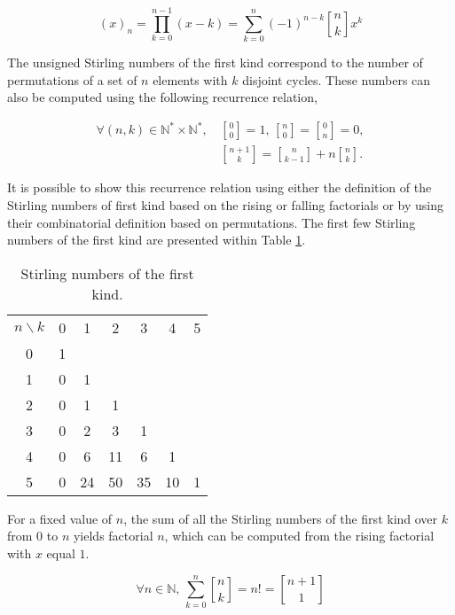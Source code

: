 \begin{equation} \label{eqnA.2}
(x)_{n} = \prod_{k=0}^{n-1} (x-k) = \sum_{k=0}^{n} (-1)^{n-k} \genfrac{[}{]}{0pt}{0}{n}{k} x^{k} 
\end{equation}

The unsigned Stirling numbers of the first kind correspond to the number of permutations of a set of $n$ elements with $k$ disjoint cycles. These numbers can also be computed using the following recurrence relation,

\begin{subequations} \label{eqnA.3}
\begin{align}
\forall (n,k) \in \mathbb{N}^{*} \times \mathbb{N}^{*} ,\, & \genfrac{[}{]}{0pt}{0}{0}{0} = 1 ,\, \genfrac{[}{]}{0pt}{0}{n}{0} = \genfrac{[}{]}{0pt}{0}{0}{n} = 0, \label{eqnA.3a} \\
& \genfrac{[}{]}{0pt}{0}{n+1}{k} = \genfrac{[}{]}{0pt}{0}{n}{k-1} + n \genfrac{[}{]}{0pt}{0}{n}{k}. \label{eqnA.3b}
\end{align}
\end{subequations}

It is possible to show this recurrence relation using either the definition of the Stirling numbers of first kind based on the rising or falling factorials or by using their combinatorial definition based on permutations. The first few Stirling numbers of the first kind are presented within Table \ref{tabA.1}.

\begin{table}[!htbp]
\centering
\caption{Stirling numbers of the first kind.}
\label{tabA.1}
\begin{tabular}{ccccccc}
\toprule
$n \backslash k$ & 0 & 1 & 2 & 3 & 4 & 5 \\
\cmidrule(lr){1-7}
0 & 1 & & & & & \\
1 & 0 & 1 & & & & \\
2 & 0 & 1 & 1 & & & \\
3 & 0 & 2 & 3 & 1 & & \\
4 & 0 & 6 & 11 & 6 & 1 & \\
5 & 0 & 24 & 50 & 35 & 10 & 1 \\
\bottomrule
\end{tabular}
\end{table}

For a fixed value of $n$, the sum of all the Stirling numbers of the first kind over $k$ from $0$ to $n$ yields factorial $n$, which can be computed from the rising factorial with $x$ equal $1$.

\begin{equation} \label{eqnA.4}
\forall n \in \mathbb{N} ,\, \sum_{k=0}^{n} \genfrac{[}{]}{0pt}{0}{n}{k} = n! = \genfrac{[}{]}{0pt}{0}{n+1}{1}
\end{equation}

